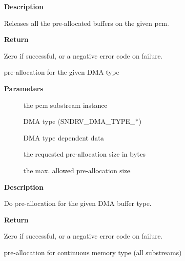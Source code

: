 \documentclass[a4paper,8pt,english]{sphinxmanual}
\begin{document}
\textbf{Description}

Releases all the pre-allocated buffers on the given pcm.

\textbf{Return}

Zero if successful, or a negative error code on failure.

\begin{fulllineitems}
\label{sound/kernel-api/alsa-driver-api:c.snd_pcm_lib_preallocate_pages}
pre-allocation for the given DMA type

\end{fulllineitems}


\textbf{Parameters}
\begin{description}
\item[{}] \leavevmode
the pcm substream instance

\item[{}] \leavevmode
DMA type (SNDRV\_DMA\_TYPE\_*)

\item[{}] \leavevmode
DMA type dependent data

\item[{}] \leavevmode
the requested pre-allocation size in bytes

\item[{}] \leavevmode
the max. allowed pre-allocation size

\end{description}

\textbf{Description}

Do pre-allocation for the given DMA buffer type.

\textbf{Return}

Zero if successful, or a negative error code on failure.

\begin{fulllineitems}
\label{sound/kernel-api/alsa-driver-api:c.snd_pcm_lib_preallocate_pages_for_all}
pre-allocation for continuous memory type (all substreams)

\end{fulllineitems}
\end{document}
